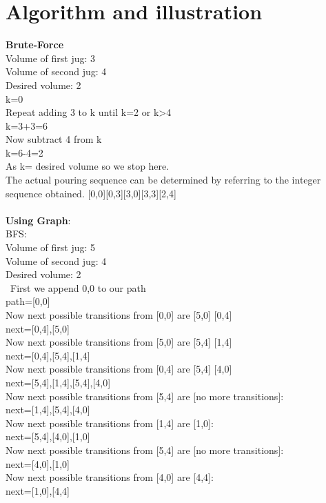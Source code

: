 \documentclass[conference]{IEEEtran}
\begin{document}
\section{Algorithm and illustration}
\textbf{Brute-Force}\\
Volume of first jug: 3\\
Volume of second jug: 4\\
Desired volume: 2\\
k=0\\
Repeat adding 3 to k until k=2 or k>4\\
k=3+3=6\\
Now subtract 4 from k\\
k=6-4=2\\
As k= desired volume so we stop here.\\
The actual pouring sequence can be determined by referring to the integer sequence obtained.
[0,0][0,3][3,0][3,3][2,4]
\\ \\
\textbf{Using Graph}:\\
BFS:\\
Volume of first jug: 5\\
Volume of second jug: 4\\
Desired volume: 2\\\
First we append {0,0} to our path\\
path={[0,0]}\\
Now next possible transitions from [0,0] are [5,0] [0,4]\\
next={[0,4],[5,0]}\\
Now next possible transitions from [5,0] are [5,4] [1,4]\\
next={[0,4],[5,4],[1,4]}\\
Now next possible transitions from [0,4] are [5,4] [4,0]\\
next={[5,4],[1,4],[5,4],[4,0]}\\
Now next possible transitions from [5,4] are [no more transitions]:\\
next={[1,4],[5,4],[4,0]}\\
Now next possible transitions from [1,4] are [1,0]:\\
next={[5,4],[4,0],[1,0]}\\
Now next possible transitions from [5,4] are [no more transitions]:\\
next={[4,0],[1,0]}\\
Now next possible transitions from [4,0] are [4,4]:\\
next={[1,0],[4,4]}\\
\end{document}
